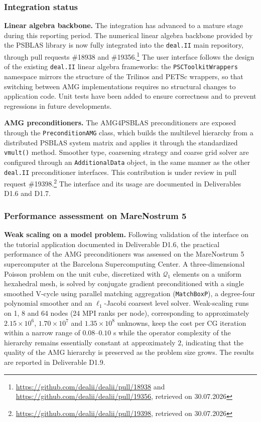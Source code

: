 \documentclass[a4paper,12pt, numbers]{article}
\newcommand{\dealii}{\texttt{deal.II}}
\begin{document}
\subsubsection*{Integration status}

\noindent\textbf{Linear algebra backbone.}
The integration has advanced to a mature stage during this reporting period. The numerical linear algebra backbone provided by the PSBLAS library is now fully integrated into the \dealii{} main repository, through pull requests \#18938 and \#19356.\footnote{\url{https://github.com/dealii/dealii/pull/18938} and \url{https://github.com/dealii/dealii/pull/19356}, retrieved on 30.07.2026} The user interface follows the design of the existing \dealii{} linear algebra frameworks: the \texttt{PSCToolkitWrappers} namespace mirrors the structure of the Trilinos and PETSc wrappers, so that switching between AMG implementations requires no structural changes to application code. Unit tests have been added to ensure correctness and to prevent regressions in future developments.

\noindent\textbf{AMG preconditioners.}
The AMG4PSBLAS preconditioners are exposed through the \texttt{PreconditionAMG} class, which builds the multilevel hierarchy from a distributed PSBLAS system matrix and applies it through the standardized \texttt{vmult()} method. Smoother type, coarsening strategy and coarse grid solver are configured through an \texttt{AdditionalData} object, in the same manner as the other \dealii{} preconditioner interfaces. This contribution is under review in pull request \#19398.\footnote{\url{https://github.com/dealii/dealii/pull/19398}, retrieved on 30.07.2026} The interface and its usage are documented in Deliverables D1.6 and D1.7.

\subsubsection*{Performance assessment on MareNostrum 5}

\noindent\textbf{Weak scaling on a model problem.}
Following validation of the interface on the tutorial application documented in Deliverable D1.6, the practical performance of the AMG preconditioners was assessed on the MareNostrum 5 supercomputer at the Barcelona Supercomputing Center. A three-dimensional Poisson problem on the unit cube, discretized with $\mathcal{Q}_1$ elements on a uniform hexahedral mesh, is solved by conjugate gradient preconditioned with a single smoothed V-cycle using parallel matching aggregation (\texttt{MatchBoxP}), a degree-four polynomial smoother and an $\ell_1$-Jacobi coarsest level solver. Weak-scaling runs on 1, 8 and 64 nodes (24 MPI ranks per node), corresponding to approximately $2.15\times 10^{6}$, $1.70\times 10^{7}$ and $1.35\times 10^{8}$ unknowns, keep the cost per CG iteration within a narrow range of $0.08$--$0.10$ s while the operator complexity of the hierarchy remains essentially constant at approximately $2$, indicating that the quality of the AMG hierarchy is preserved as the problem size grows. The results are reported in Deliverable D1.9.
\end{document}
